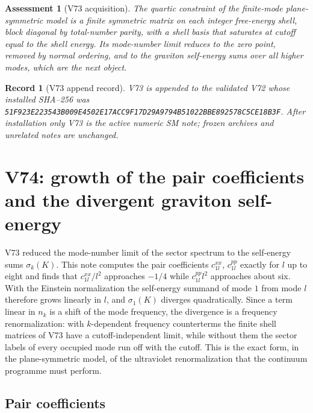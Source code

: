 \documentclass[11pt]{article}
\newtheorem{assessment}[theorem]{Assessment}
\newtheorem{record}[theorem]{Record}
\theoremstyle{remark}
\begin{document}
\begin{assessment}[V73 acquisition]
\label{ass:v19v73}
The quartic constraint of the finite-mode plane-symmetric model is a
finite symmetric matrix on each integer free-energy shell, block
diagonal by total-number parity, with a shell basis that saturates at
cutoff equal to the shell energy.  Its mode-number limit reduces to the
zero point, removed by normal ordering, and to the graviton
self-energy sums over all higher modes, which are the next object.
\end{assessment}

\begin{record}[V73 append record]
\label{rec:v19v73}
V73 is appended to the validated V72 whose installed SHA--256 was
\texttt{51F923E223543B009E4502E17ACC9F17D29A9794B51022BBE892578C5CE18B3F}.
After installation only V73 is the active numeric SM note; frozen
archives and unrelated notes are unchanged.
\end{record}


\section{V74: growth of the pair coefficients and the divergent graviton self-energy}
\label{sec:v19v74}

V73 reduced the mode-number limit of the sector spectrum to the
self-energy sums \(\sigma_k(K)\).  This note computes the pair
coefficients \(c^{xx}_{1l}\), \(c^{pp}_{1l}\) exactly for \(l\) up to
eight and finds that \(c^{xx}_{1l}/l^2\) approaches \(-1/4\) while
\(c^{pp}_{1l}l^2\) approaches about six.  With the Einstein
normalization the self-energy summand of mode \(1\) from mode \(l\)
therefore grows linearly in \(l\), and \(\sigma_1(K)\) diverges
quadratically.  Since a term linear in \(n_k\) is a shift of the mode
frequency, the divergence is a frequency renormalization: with
\(k\)-dependent frequency counterterms the finite shell matrices of
V73 have a cutoff-independent limit, while without them the sector
labels of every occupied mode run off with the cutoff.  This is the
exact form, in the plane-symmetric model, of the ultraviolet
renormalization that the continuum programme must perform.

\subsection{Pair coefficients}
\end{document}
